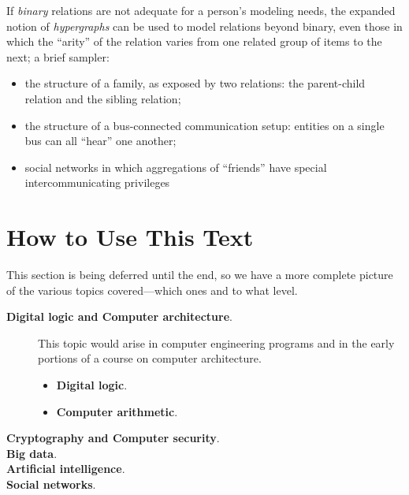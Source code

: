 \medskip

If {\em binary} relations are not adequate for a person's modeling
needs, the expanded notion of {\em hypergraphs} can be used to model
relations beyond binary, even those in which the ``arity'' of the
relation varies from one related group of items to the next; a brief
sampler:
\begin{itemize}
\item
the structure of a family, as exposed by two relations: the
parent-child relation and the sibling relation;
\item
the structure of a bus-connected communication setup: entities on a
single bus can all ``hear'' one another;
\item
social networks in which aggregations of ``friends'' have special
intercommunicating privileges
\end{itemize}


\section{How to Use This Text}
\label{sec:how-to-use}

{\Arny This section is being deferred until the end, so we have a
more complete picture of the various topics covered---which ones and
to what level.}

\begin{description}
\item[{\bf Digital logic and Computer architecture}.]
 
This topic would arise in computer engineering programs and in the
early portions of a course on computer architecture.
\begin{itemize}
\item
{\bf Digital logic}. 
\item
{\bf Computer arithmetic}.  
\end{itemize}

\item[{\bf Cryptography and Computer security}.]


\item[{\bf Big data}.]


\item[{\bf Artificial intelligence}.]


\item[{\bf Social networks}.]

\end{description}





